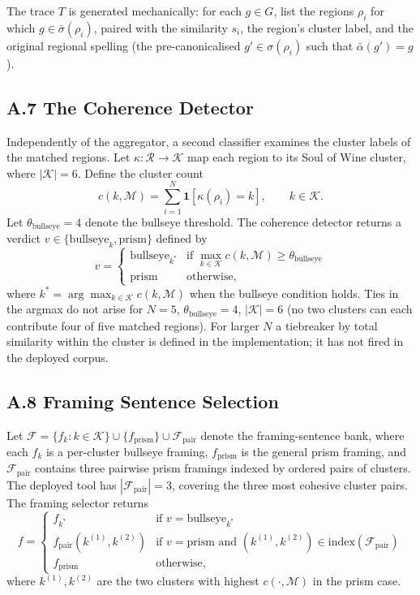 \documentclass[11pt]{article}
\providecommand{\indicator}{\mathbf{1}}
\begin{document}
The trace $T$ is generated mechanically: for each $g \in G$, list the regions $\rho_i$ for which $g \in \bar\sigma(\rho_i)$, paired with the similarity $s_i$, the region's cluster label, and the original regional spelling (the pre-canonicalised $g' \in \sigma(\rho_i)$ such that $\bar\alpha(g') = g$).

\subsection*{A.7 The Coherence Detector}
Independently of the aggregator, a second classifier examines the cluster labels of the matched regions. Let $\kappa : \mathcal{R} \to \mathcal{K}$ map each region to its Soul of Wine cluster, where $|\mathcal{K}| = 6$. Define the cluster count
\[
c(k, \mathcal{M}) = \sum_{i=1}^{N} \indicator[\kappa(\rho_i) = k], \qquad k \in \mathcal{K}.
\]
Let $\theta_{\mathrm{bullseye}} = 4$ denote the bullseye threshold. The coherence detector returns a verdict $v \in \{ \mathrm{bullseye}_k, \mathrm{prism} \}$ defined by
\[
v =
\begin{cases}
\mathrm{bullseye}_{k^{*}} & \text{if } \max_{k \in \mathcal{K}} c(k, \mathcal{M}) \geq \theta_{\mathrm{bullseye}} \\
\mathrm{prism}            & \text{otherwise,}
\end{cases}
\]
where $k^{*} = \arg\max_{k \in \mathcal{K}} c(k, \mathcal{M})$ when the bullseye condition holds. Ties in the argmax do not arise for $N = 5$, $\theta_{\mathrm{bullseye}} = 4$, $|\mathcal{K}| = 6$ (no two clusters can each contribute four of five matched regions). For larger $N$ a tiebreaker by total similarity within the cluster is defined in the implementation; it has not fired in the deployed corpus.

\subsection*{A.8 Framing Sentence Selection}
Let $\mathcal{F} = \{ f_{k} : k \in \mathcal{K} \} \cup \{ f_{\mathrm{prism}} \} \cup \mathcal{F}_{\mathrm{pair}}$ denote the framing-sentence bank, where each $f_{k}$ is a per-cluster bullseye framing, $f_{\mathrm{prism}}$ is the general prism framing, and $\mathcal{F}_{\mathrm{pair}}$ contains three pairwise prism framings indexed by ordered pairs of clusters. The deployed tool has $|\mathcal{F}_{\mathrm{pair}}| = 3$, covering the three most cohesive cluster pairs. The framing selector returns
\[
f =
\begin{cases}
f_{k^{*}}                              & \text{if } v = \mathrm{bullseye}_{k^{*}} \\
f_{\mathrm{pair}}(k^{(1)}, k^{(2)})    & \text{if } v = \mathrm{prism} \text{ and } (k^{(1)}, k^{(2)}) \in \mathrm{index}(\mathcal{F}_{\mathrm{pair}}) \\
f_{\mathrm{prism}}                     & \text{otherwise,}
\end{cases}
\]
where $k^{(1)}, k^{(2)}$ are the two clusters with highest $c(\cdot, \mathcal{M})$ in the prism case.
\end{document}
